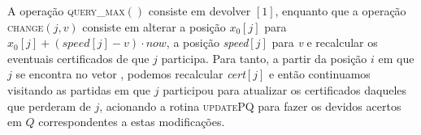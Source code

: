 



A operação \textsc{query\_max}$()$ consiste em devolver
\torneio$[1]$, enquanto que a operação \textsc{change}$(j, v)$
consiste em alterar a posição $x_0[j]$ para $x_0[j] +
(\mathit{speed}[j] - v)\cdot now$, a posição \textit{speed}$[j]$
para \textit{v} e recalcular os eventuais certificados de que $j$
participa. Para tanto, a partir da posição $i$ em que $j$ se
encontra no vetor \torneio, podemos recalcular \textit{cert}$[j]$ e
então continuamos visitando as partidas em que $j$ participou para
atualizar os certificados daqueles que perderam de $j$, acionando a
rotina \textsc{updatePQ} para fazer os devidos acertos em $Q$
correspondentes a estas modificações.







